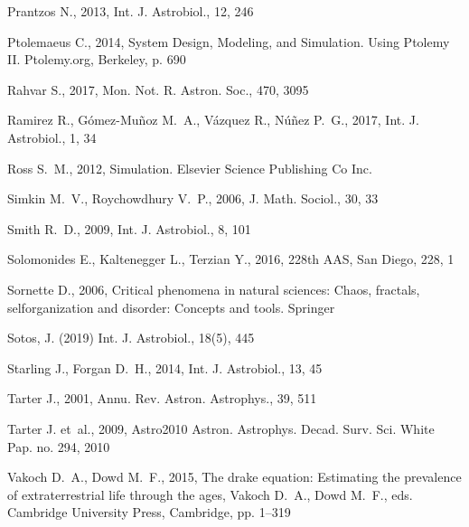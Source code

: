 \documentclass[crop]{CSLB}
\begin{document}
\begin{thebibliography}{95}
Prantzos N., 2013, Int. J. Astrobiol., 12, 246

Ptolemaeus C., 2014, {System Design, Modeling, and Simulation. Using Ptolemy
  II}. Ptolemy.org, Berkeley, p. 690

Rahvar S., 2017, Mon. Not. R. Astron. Soc., 470, 3095

Ramirez R., G{\'{o}}mez-Mu{\~{n}}oz M.~A., V{\'{a}}zquez R., N{\'{u}}{\~{n}}ez
  P.~G., 2017, Int. J. Astrobiol., 1, 34

Ross S.~M., 2012, {Simulation}. Elsevier Science Publishing Co Inc.

Simkin M.~V., Roychowdhury V.~P., 2006, J. Math. Sociol., 30, 33

Smith R.~D., 2009, Int. J. Astrobiol., 8, 101

Solomonides E., Kaltenegger L., Terzian Y., 2016, 228th AAS, San Diego, 228, 1

Sornette D., 2006, {Critical phenomena in natural sciences: Chaos, fractals,
  selforganization and disorder: Concepts and tools}. Springer

Sotos, J. (2019) Int. J. Astrobiol., 18(5), 445

Starling J., Forgan D.~H., 2014, Int. J. Astrobiol., 13, 45

Tarter J., 2001, Annu. Rev. Astron. Astrophys., 39, 511

Tarter J. {et~al.}, 2009, Astro2010 Astron. Astrophys. Decad. Surv. Sci. White
  Pap. no. 294, 2010

Vakoch D.~A., Dowd M.~F., 2015, {The drake equation: Estimating the prevalence
  of extraterrestrial life through the ages}, Vakoch D.~A., Dowd M.~F., eds.
  Cambridge University Press, Cambridge, pp. 1--319


\end{thebibliography}
\end{document}
